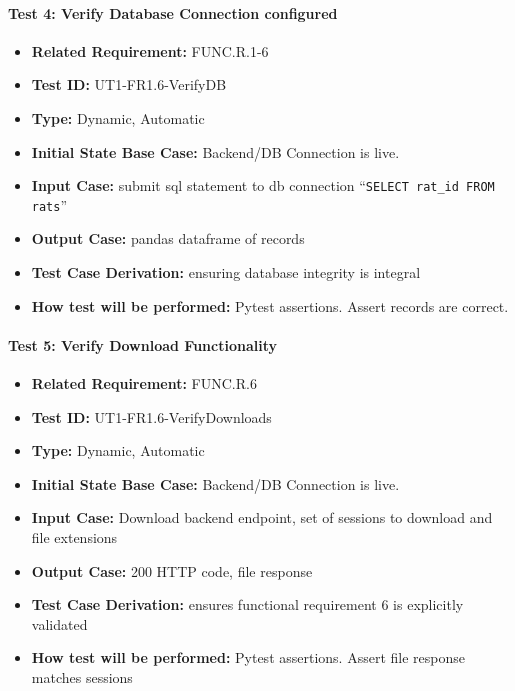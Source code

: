 \documentclass[12pt, titlepage]{article}
\begin{document}
\begin{flushleft}
\paragraph{Test 4: Verify Database Connection configured}
\begin{itemize}
    \item \textbf{Related Requirement:} FUNC.R.1-6
    \item \textbf{Test ID:} UT1-FR1.6-VerifyDB
    \item \textbf{Type:} Dynamic, Automatic
    \item \textbf{Initial State Base Case:} Backend/DB Connection is live.
    \item \textbf{Input Case:} submit sql statement to db connection ``\texttt{SELECT rat\_id FROM rats}''
    \item \textbf{Output Case:} pandas dataframe of records
    \item \textbf{Test Case Derivation:} ensuring database integrity is integral
    \item \textbf{How test will be performed:} Pytest assertions. Assert records are correct.
\end{itemize}

\paragraph{Test 5: Verify Download Functionality}
\begin{itemize}
    \item \textbf{Related Requirement:} FUNC.R.6
    \item \textbf{Test ID:} UT1-FR1.6-VerifyDownloads
    \item \textbf{Type:} Dynamic, Automatic
    \item \textbf{Initial State Base Case:} Backend/DB Connection is live.
     \item \textbf{Input Case:} Download backend endpoint, set of sessions to download and file extensions
    \item \textbf{Output Case:} 200 HTTP code, file response
    \item \textbf{Test Case Derivation:} ensures functional requirement 6 is explicitly validated
    \item \textbf{How test will be performed:} Pytest assertions. Assert file response matches sessions
\end{itemize}


\end{flushleft}
\end{document}
